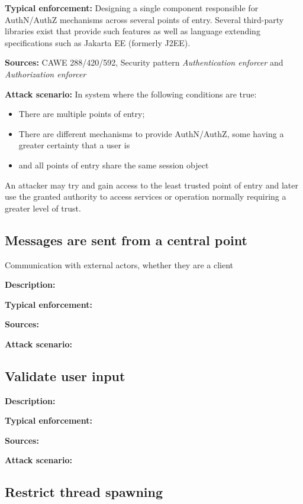  \textbf{Typical enforcement:} Designing a single component responsible for AuthN/AuthZ mechanisms across several points of entry. Several third-party libraries exist that provide such features as well as language extending specifications such as Jakarta EE (formerly J2EE). 
 
 \textbf{Sources:} CAWE 288/420/592, Security pattern \textit{Authentication enforcer} and \textit{Authorization enforcer}
 
 \textbf{Attack scenario:} In system where the following conditions are true:
 
 \begin{itemize}
     \item There are multiple points of entry; 
     \item There are different mechanisms to provide AuthN/AuthZ, some having a greater certainty that a user is 
     \item and all points of entry share the same session object
 \end{itemize}
 
  An attacker may try and gain access to the least trusted point of entry and later use the granted authority to access services or operation normally requiring a greater level of trust.

\subsection{Messages are sent from a central point} 
Communication with external actors, whether they are a client 

\textbf{Description:} 
 
 \textbf{Typical enforcement:}
 
 \textbf{Sources:}
 
 \textbf{Attack scenario:}

\subsection{Validate user input}  

\textbf{Description:} 
 
 \textbf{Typical enforcement:}
 
 \textbf{Sources:}
 
 \textbf{Attack scenario:}

\subsection{Restrict thread spawning} 

